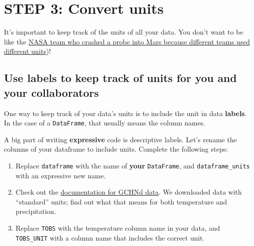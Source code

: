 \documentclass[
  letterpaper,
  DIV=11,
  numbers=noendperiod,
  oneside]{scrreprt}
\providecommand{\tightlist}{%
  \setlength{\itemsep}{0pt}\setlength{\parskip}{0pt}}
\begin{document}
\chapter{STEP 3: Convert units}\label{step-3-convert-units}

It's important to keep track of the units of all your data. You don't
want to be like the
\href{https://www.latimes.com/archives/la-xpm-1999-oct-01-mn-17288-story.html}{NASA
team who crashed a probe into Mars because different teams used
different units})!

\section{Use labels to keep track of units for you and your
collaborators}\label{use-labels-to-keep-track-of-units-for-you-and-your-collaborators}

One way to keep track of your data's units is to include the unit in
data \textbf{labels}. In the case of a \texttt{DataFrame}, that usually
means the column names.

\begin{tcolorbox}[enhanced jigsaw, colbacktitle=quarto-callout-color!10!white, opacityback=0, bottomtitle=1mm, toptitle=1mm, bottomrule=.15mm, left=2mm, colframe=quarto-callout-color-frame, leftrule=.75mm, opacitybacktitle=0.6, colback=white, rightrule=.15mm, toprule=.15mm, breakable, titlerule=0mm, title=\textcolor{quarto-callout-color}{\faInfo}\hspace{0.5em}{Try It: Add units to your column name}, coltitle=black, arc=.35mm]

A big part of writing \textbf{expressive} code is descriptive labels.
Let's rename the columns of your dataframe to include units. Complete
the following steps:

\begin{enumerate}
\def\labelenumi{\arabic{enumi}.}
\tightlist
\item
  Replace \texttt{dataframe} with the name of \textbf{your}
  \texttt{DataFrame}, and \texttt{dataframe\_units} with an expressive
  new name.
\item
  Check out the
  \href{https://www.ncei.noaa.gov/data/global-historical-climatology-network-daily/doc/GHCND_documentation.pdf}{documentation
  for GCHNd data}. We downloaded data with ``standard'' units; find out
  what that means for both temperature and precipitation.
\item
  Replace \texttt{\textquotesingle{}TOBS\textquotesingle{}} with the
  temperature column name in your data, and
  \texttt{\textquotesingle{}TOBS\_UNIT\textquotesingle{}} with a column
  name that includes the correct unit.
\end{enumerate}

\end{tcolorbox}
\end{document}
